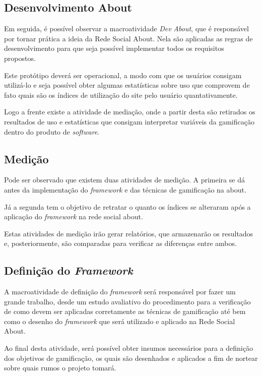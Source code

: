 \subsection{Desenvolvimento About}
\label{sub:Desenvolvimentoabout}
Em seguida, é possível observar a macroatividade \textit{Dev} \textit{About}, que é responsável
por tornar prática a ideia da Rede Social About. Nela são aplicadas as
regras de desenvolvimento para que seja possível implementar todos os
requisitos propostos.

Este protótipo deverá ser operacional, a modo com que os usuários consigam
utilizá-lo e seja possível obter algumas estatísticas sobre uso que comprovem
de fato quais são os índices de utilização do site pelo usuário quantativamente.

Logo a frente existe a atividade de mediação, onde a partir desta são retirados
os resultados de uso e estatísticas que consigam interpretar variáveis da gamificação
dentro do produto de \textit{software}. 

\subsection{Medição}
\label{sub:medicao}
Pode ser observado que existem duas atividades de medição. A primeira se dá
antes da implementação do \textit{framework}  e das técnicas de gamificação na about.

Já a segunda tem o objetivo de retratar o quanto os índices se alteraram após
a aplicação do \textit{framework} na rede social about.

Estas atividades de medição irão gerar relatórios, que armazenarão os resultados
e, posteriormente, são comparadas para verificar as diferenças entre ambos.

\subsection{Definição do \textit{Framework}}
\label{sub:definicaoframework}
A macroatividade de definição do \textit{framework} será responsável por fazer um grande
trabalho, desde um estudo avaliativo do procedimento para a verificação de como
devem ser aplicadas corretamente as técnicas de gamificação até bem como o desenho
do \textit{framework} que será utilizado e aplicado na Rede Social About.

Ao final desta atividade, será possível obter insumos necessários para a definição
dos objetivos de gamificação, os quais são desenhados e aplicados a fim
de nortear sobre quais rumos o projeto tomará.

